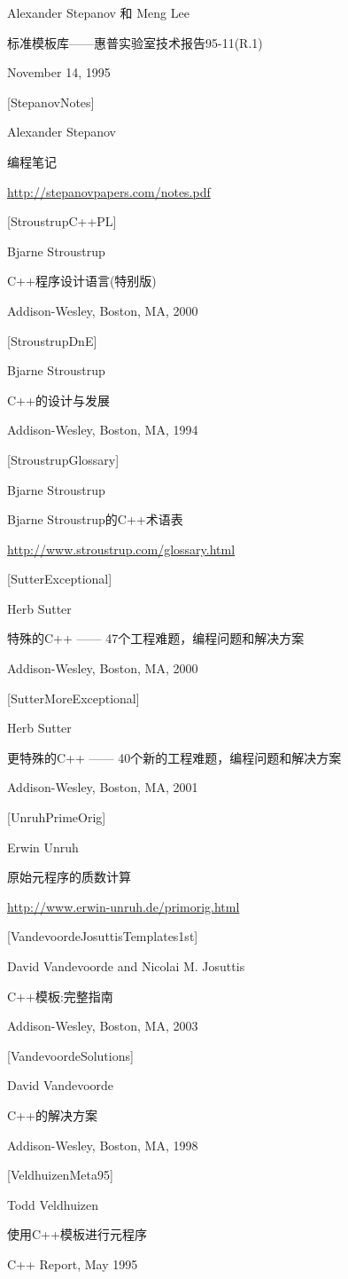 Alexander Stepanov 和 Meng Lee

标准模板库——惠普实验室技术报告95-11(R.1)

November 14, 1995

{[StepanovNotes]}

Alexander Stepanov

编程笔记

\url{http://stepanovpapers.com/notes.pdf}

{[StroustrupC++PL]}

Bjarne Stroustrup

C++程序设计语言(特别版)

Addison-Wesley, Boston, MA, 2000

{[StroustrupDnE]}

Bjarne Stroustrup

C++的设计与发展

Addison-Wesley, Boston, MA, 1994

{[StroustrupGlossary]}

Bjarne Stroustrup

Bjarne Stroustrup的C++术语表

\url{http://www.stroustrup.com/glossary.html}

{[SutterExceptional]}

Herb Sutter

特殊的C++ —— 47个工程难题，编程问题和解决方案

Addison-Wesley, Boston, MA, 2000

{[SutterMoreExceptional]}

Herb Sutter

更特殊的C++ —— 40个新的工程难题，编程问题和解决方案

Addison-Wesley, Boston, MA, 2001

{[UnruhPrimeOrig]}

Erwin Unruh

原始元程序的质数计算

\url{http://www.erwin-unruh.de/primorig.html}

{[VandevoordeJosuttisTemplates1st]}

David Vandevoorde and Nicolai M. Josuttis

C++模板:完整指南

Addison-Wesley, Boston, MA, 2003

{[VandevoordeSolutions]}

David Vandevoorde

C++的解决方案

Addison-Wesley, Boston, MA, 1998

{[VeldhuizenMeta95]}

Todd Veldhuizen

使用C++模板进行元程序

C++ Report, May 1995























